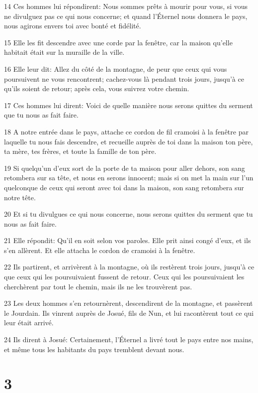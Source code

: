 \par 14 Ces hommes lui répondirent: Nous sommes prêts à mourir pour vous, si vous ne divulguez pas ce qui nous concerne; et quand l'Éternel nous donnera le pays, nous agirons envers toi avec bonté et fidélité.
\par 15 Elle les fit descendre avec une corde par la fenêtre, car la maison qu'elle habitait était sur la muraille de la ville.
\par 16 Elle leur dit: Allez du côté de la montagne, de peur que ceux qui vous poursuivent ne vous rencontrent; cachez-vous là pendant trois jours, jusqu'à ce qu'ils soient de retour; après cela, vous suivrez votre chemin.
\par 17 Ces hommes lui dirent: Voici de quelle manière nous serons quittes du serment que tu nous as fait faire.
\par 18 A notre entrée dans le pays, attache ce cordon de fil cramoisi à la fenêtre par laquelle tu nous fais descendre, et recueille auprès de toi dans la maison ton père, ta mère, tes frères, et toute la famille de ton père.
\par 19 Si quelqu'un d'eux sort de la porte de ta maison pour aller dehors, son sang retombera sur sa tête, et nous en serons innocent; mais si on met la main sur l'un quelconque de ceux qui seront avec toi dans la maison, son sang retombera sur notre tête.
\par 20 Et si tu divulgues ce qui nous concerne, nous serons quittes du serment que tu nous as fait faire.
\par 21 Elle répondit: Qu'il en soit selon vos paroles. Elle prit ainsi congé d'eux, et ils s'en allèrent. Et elle attacha le cordon de cramoisi à la fenêtre.
\par 22 Ils partirent, et arrivèrent à la montagne, où ils restèrent trois jours, jusqu'à ce que ceux qui les poursuivaient fussent de retour. Ceux qui les poursuivaient les cherchèrent par tout le chemin, mais ils ne les trouvèrent pas.
\par 23 Les deux hommes s'en retournèrent, descendirent de la montagne, et passèrent le Jourdain. Ils vinrent auprès de Josué, fils de Nun, et lui racontèrent tout ce qui leur était arrivé.
\par 24 Ils dirent à Josué: Certainement, l'Éternel a livré tout le pays entre nos mains, et même tous les habitants du pays tremblent devant nous.

\chapter{3}

